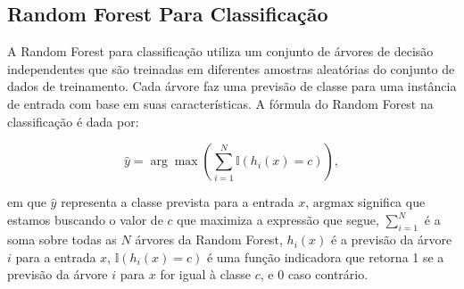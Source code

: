 \documentclass[12pt,oneside,a4paper,chapter=TITLE,
			   english,brazil]{abntex2}
\begin{document}



\subsection{Random Forest  Para Classificação}

A Random Forest para classificação utiliza um conjunto de árvores de decisão independentes que são treinadas em diferentes amostras aleatórias do conjunto de dados de treinamento. Cada árvore faz uma previsão de classe para uma instância de entrada com base em suas características. A fórmula do Random Forest na classificação é dada por:


\begin{equation}
    \hat{y} = \arg\max \left( \sum_{i=1}^{N} \mathbb{I}(h_i(x) = c) \right),
\end{equation}



\noindent  em que $\hat{y}$ representa a classe prevista para a entrada \(x\),
$\underset{}{\text{argmax}}$ significa que estamos buscando o valor de \(c\) que maximiza a expressão que segue,
\(\sum_{i=1}^{N}\) é a soma sobre todas as \(N\) árvores da Random Forest,
\(h_i(x)\) é a previsão da árvore \(i\) para a entrada \(x\),
\(\mathbb{I}(h_i(x) = c)\) é uma função indicadora que retorna 1 se a previsão da árvore \(i\) para \(x\) for igual à classe \(c\), e 0 caso contrário. \\
 
\end{document}
